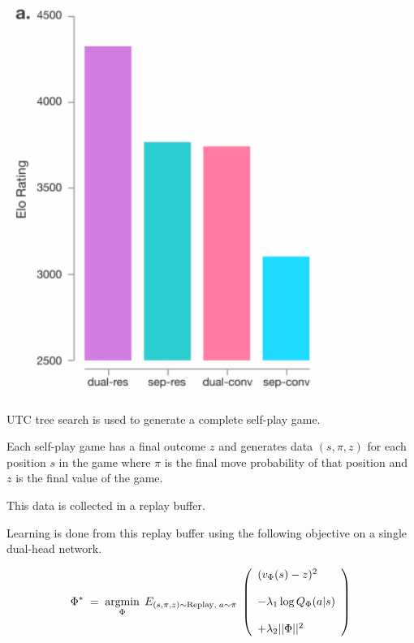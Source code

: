 {

\centerline{\includegraphics[height = 5in]{../images/alphaablation}}


UTC tree search is used to generate a complete self-play game.

\vfill
Each self-play game has a final outcome $z$ and generates data $(s,\pi,z)$ for each position $s$ in the game where $\pi$ is the final move probability of that position
and $z$ is the final value of the game.

\vfill
This data is collected in a replay buffer.


\vfill
Learning is done from this replay buffer using the following objective on a single dual-head network.

\vfill
$$\Phi^*\; = \;\operatorname*{argmin}_\Phi \;E_{(s,\pi,z) \sim \mathrm{Replay},\;a \sim \pi}\;\left(\begin{array}{l} (v_\Phi(s) - z)^2 \\ \\ - \lambda_1\log Q_\Phi(a|s) \\ \\ + \lambda_2||\Phi||^2\end{array}\right)$$

}
